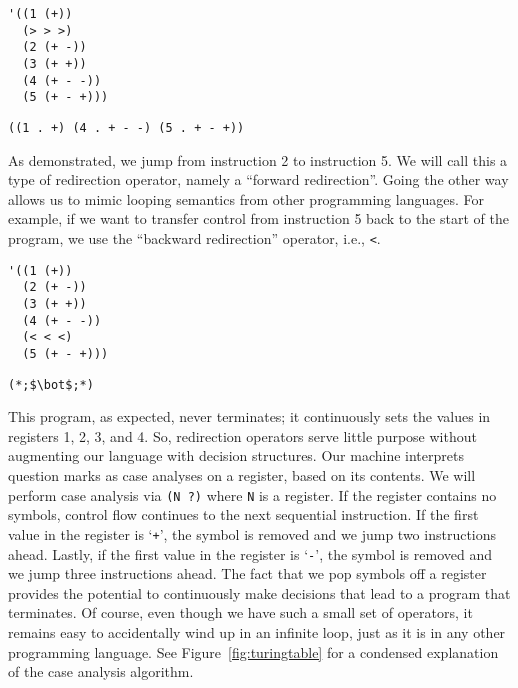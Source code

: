 \begin{cloast}[]{}
\begin{lstlisting}[language=MyNLNScheme]
'((1 (+))
  (> > >)
  (2 (+ -))
  (3 (+ +))
  (4 (+ - -))
  (5 (+ - +)))
\end{lstlisting}
\tcblower
\begin{lstlisting}[language=MyOutput]
((1 . +) (4 . + - -) (5 . + - +))
\end{lstlisting}
\end{cloast}

As demonstrated, we jump from instruction 2 to instruction 5. We will call this a type of redirection operator, namely a ``forward redirection''. Going the other way allows us to mimic looping semantics from other programming languages. For example, if we want to transfer control from instruction 5 back to the start of the program, we use the ``backward redirection'' operator, i.e., \texttt{<}. 

\begin{cloast}[]{}
\begin{lstlisting}[language=MyNLNScheme]
'((1 (+))
  (2 (+ -))
  (3 (+ +))
  (4 (+ - -))
  (< < <)
  (5 (+ - +)))
\end{lstlisting}
\tcblower
\begin{lstlisting}[language=MyOutput]
(*;$\bot$;*)
\end{lstlisting}
\end{cloast}

This program, as expected, never terminates; it continuously sets the values in registers 1, 2, 3, and 4. So, redirection operators serve little purpose without augmenting our language with decision structures. Our machine interprets question marks as case analyses on a register, based on its contents. We will perform case analysis via \texttt{(N ?)} where \texttt{N} is a register. If the register contains no symbols, control flow continues to the next sequential instruction. If the first value in the register is `\texttt{+}', the symbol is removed and we jump two instructions ahead. Lastly, if the first value in the register is `\texttt{-}', the symbol is removed and we jump three instructions ahead. The fact that we pop symbols off a register provides the potential to continuously make decisions that lead to a program that terminates. Of course, even though we have such a small set of operators, it remains easy to accidentally wind up in an infinite loop, just as it is in any other programming language. See Figure~\ref{fig:turingtable} for a condensed explanation of the case analysis algorithm.

